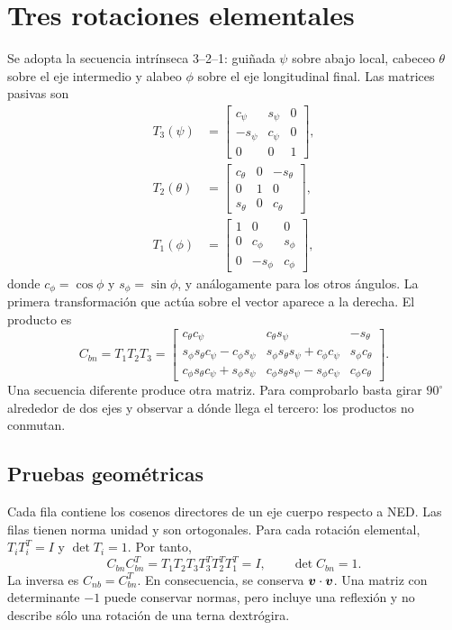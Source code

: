 \section{Tres rotaciones elementales}
Se adopta la secuencia intrínseca 3--2--1: guiñada $\psi$ sobre abajo local, cabeceo $\theta$ sobre el eje intermedio y alabeo $\phi$ sobre el eje longitudinal final. Las matrices pasivas son
\begin{align}
T_3(\psi)&=\begin{bmatrix}c_\psi&s_\psi&0\\-s_\psi&c_\psi&0\\0&0&1\end{bmatrix},\\
T_2(\theta)&=\begin{bmatrix}c_\theta&0&-s_\theta\\0&1&0\\s_\theta&0&c_\theta\end{bmatrix},\\
T_1(\phi)&=\begin{bmatrix}1&0&0\\0&c_\phi&s_\phi\\0&-s_\phi&c_\phi\end{bmatrix},
\end{align}
donde $c_\phi=\cos\phi$ y $s_\phi=\sin\phi$, y análogamente para los otros ángulos. La primera transformación que actúa sobre el vector aparece a la derecha. El producto es
\begin{equation}
C_{bn}=T_1T_2T_3=
\begin{bmatrix}
c_\theta c_\psi&c_\theta s_\psi&-s_\theta\\
s_\phi s_\theta c_\psi-c_\phi s_\psi&s_\phi s_\theta s_\psi+c_\phi c_\psi&s_\phi c_\theta\\
c_\phi s_\theta c_\psi+s_\phi s_\psi&c_\phi s_\theta s_\psi-s_\phi c_\psi&c_\phi c_\theta
\end{bmatrix}.\label{eq:Cbn}
\end{equation}
Una secuencia diferente produce otra matriz. Para comprobarlo basta girar $90^\circ$ alrededor de dos ejes y observar a dónde llega el tercero: los productos no conmutan.

\subsection{Pruebas geométricas}
Cada fila contiene los cosenos directores de un eje cuerpo respecto a NED. Las filas tienen norma unidad y son ortogonales. Para cada rotación elemental, $T_iT_i^T=I$ y $\det T_i=1$. Por tanto,
\begin{equation}
C_{bn}C_{bn}^{T}=T_1T_2T_3T_3^TT_2^TT_1^T=I,
\qquad \det C_{bn}=1.
\end{equation}
La inversa es $C_{nb}=C_{bn}^T$. En consecuencia, se conserva $\boldsymbol{v}\cdot\boldsymbol{v}$. Una matriz con determinante $-1$ puede conservar normas, pero incluye una reflexión y no describe sólo una rotación de una terna dextrógira.

